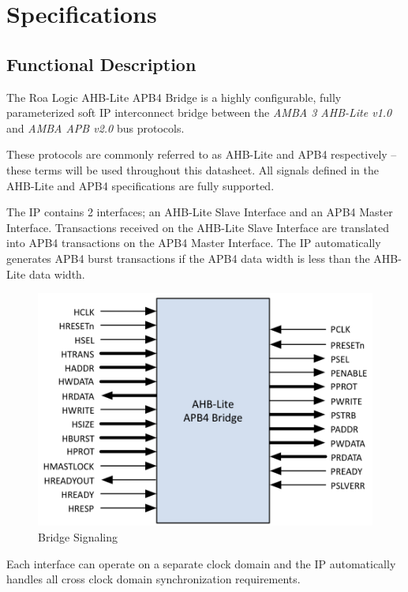 \chapter{Specifications}\label{specifications}

\section{Functional Description}\label{functional-description}

The
Roa Logic AHB-Lite APB4 Bridge is a highly configurable, fully
parameterized soft IP interconnect bridge between the \emph{AMBA 3
AHB-Lite v1.0} and \emph{AMBA APB v2.0} bus protocols.

These protocols are commonly referred to as AHB-Lite and APB4
respectively -- these terms will be used throughout this datasheet. All
signals defined in the AHB-Lite and APB4 specifications are fully
supported.

The IP contains 2 interfaces; an AHB-Lite Slave Interface and an APB4
Master Interface. Transactions received on the AHB-Lite Slave Interface
are translated into APB4 transactions on the APB4 Master Interface. The
IP automatically generates APB4 burst transactions if the APB4 data
width is less than the AHB-Lite data width.

\begin{figure}[tbh]
	\centering
	\includegraphics{assets/img/apb4-bridge-sig.png}
	\caption{Bridge Signaling}
	\label{fig:apb4-bridge-sig}
\end{figure}

Each
interface can operate on a separate clock domain and the IP
automatically handles all cross clock domain synchronization
requirements.

